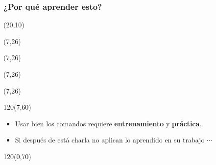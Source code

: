 \documentclass{beamer}
\begin{document}
\begin{frame}[fragile]
    \frametitle{¿Por qué aprender esto?}
    \begin{textblock}{20}(20,10)
    \end{textblock}
    \begin{textblock}{20}(7,26)
    \end{textblock}
    \begin{textblock}{20}(7,26)
    \end{textblock}
    \begin{textblock}{20}(7,26)
    \end{textblock}
    \begin{textblock}{20}(7,26)
    \end{textblock}
    \begin{textblock}{120}(7,60)
    \begin{itemize}
    \item<7-> Usar bien los comandos requiere \textbf{entrenamiento} y \textbf{práctica}.
    \item<8-> Si después de está charla no aplican lo aprendido en su trabajo $\cdots$
    \end{itemize}
    \end{textblock}
    \begin{textblock}{120}(0,70)
    \begin{center}
    \end{center}
    \end{textblock}  
\end{frame}
\end{document}
